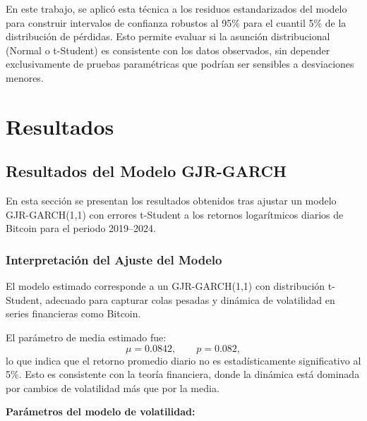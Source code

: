 \documentclass[
]{ceurart}
\begin{document}
En este trabajo, se aplicó esta técnica a los residuos estandarizados del modelo para construir intervalos de confianza robustos al 95\% para el cuantil 5\% de la distribución de pérdidas. Esto permite evaluar si la asunción distribucional (Normal o t-Student) es consistente con los datos observados, sin depender exclusivamente de pruebas paramétricas que podrían ser sensibles a desviaciones menores.

\section{Resultados}

\subsection{Resultados del Modelo GJR-GARCH}

En esta sección se presentan los resultados obtenidos tras ajustar un modelo GJR-GARCH(1,1) con errores t-Student a los retornos logarítmicos diarios de Bitcoin para el periodo 2019–2024.

\subsubsection{Interpretación del Ajuste del Modelo}

El modelo estimado corresponde a un GJR-GARCH(1,1) con distribución t-Student, adecuado para capturar colas pesadas y dinámica de volatilidad en series financieras como Bitcoin.

El parámetro de media estimado fue:
\[
\mu = 0.0842, \qquad p = 0.082,
\]
lo que indica que el retorno promedio diario no es estadísticamente significativo al 5\%. Esto es consistente con la teoría financiera, donde la dinámica está dominada por cambios de volatilidad más que por la media.

\vspace{0.3cm}
\noindent\textbf{Parámetros del modelo de volatilidad:}
\end{document}
